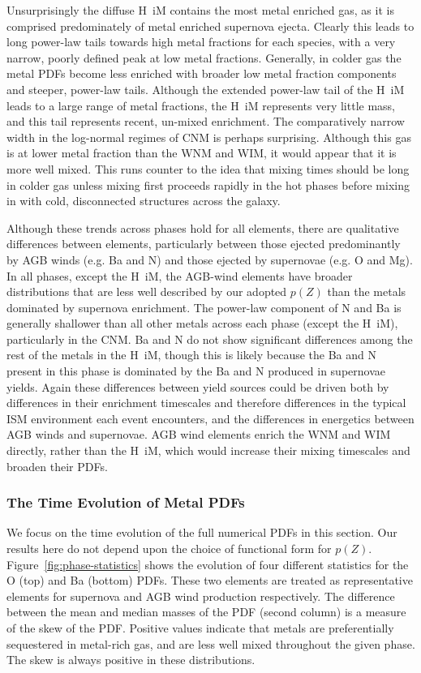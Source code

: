 \documentclass[twocolumn]{aastex61}
\begin{document}
Unsurprisingly the diffuse H~{\sc i}M contains the most metal enriched gas, as it is comprised predominately of metal enriched supernova ejecta. Clearly this leads to long power-law tails towards high metal fractions for each species, with a very narrow, poorly defined peak at low metal fractions. Generally, in colder gas the metal PDFs become less enriched with broader low metal fraction components and steeper, power-law tails. Although the extended power-law tail of the H~{\sc i}M leads to a large range of metal fractions, the H~{\sc i}M represents very little mass, and this tail represents recent, un-mixed enrichment. The comparatively narrow width in the log-normal regimes of CNM is perhaps surprising. Although this gas is at lower metal fraction than the WNM and WIM, it would appear that it is more well mixed. This runs counter to the idea that mixing times should be long in colder gas unless mixing first proceeds rapidly in the hot phases before mixing in with cold, disconnected structures across the galaxy. 

Although these trends across phases hold for all elements, there are qualitative differences between elements, particularly between those ejected predominantly by AGB winds (e.g. Ba and N) and those ejected by supernovae (e.g. O and Mg). In all phases, except the H~{\sc i}M, the AGB-wind elements have broader distributions that are less well described by our adopted $p(Z)$ than the metals dominated by supernova enrichment. The power-law component of N and Ba is generally shallower than all other metals across each phase (except the H~{\sc i}M), particularly in the CNM. Ba and N do not show significant differences among the rest of the metals in the H~{\sc i}M, though this is likely because the Ba and N present in this phase is dominated by the Ba and N produced in supernovae yields. Again these differences between yield sources could be driven both by differences in their enrichment timescales and therefore differences in the typical ISM environment each event encounters, and the differences in energetics between AGB winds and supernovae. AGB wind elements enrich the WNM and WIM directly, rather than the H~{\sc i}M, which would increase their mixing timescales and broaden their PDFs. 

\subsubsection{The Time Evolution of Metal PDFs}
\label{sec:statistics}
We focus on the time evolution of the full numerical PDFs in this section. Our results here do not depend upon the choice of functional form for $p(Z)$. Figure~\ref{fig:phase-statistics} shows the evolution of four different statistics for the O (top) and Ba (bottom) PDFs. These two elements are treated as representative elements for supernova and AGB wind production respectively. The difference between the mean and median masses of the PDF (second column) is a measure of the skew of the PDF. Positive values indicate that metals are preferentially sequestered in metal-rich gas, and are less well mixed throughout the given phase. The skew is always positive in these distributions.
\end{document}
